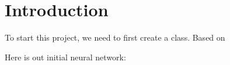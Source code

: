 \section*{Introduction}

To start this project, we need to first create a class. Based on

Here is out initial neural network:
